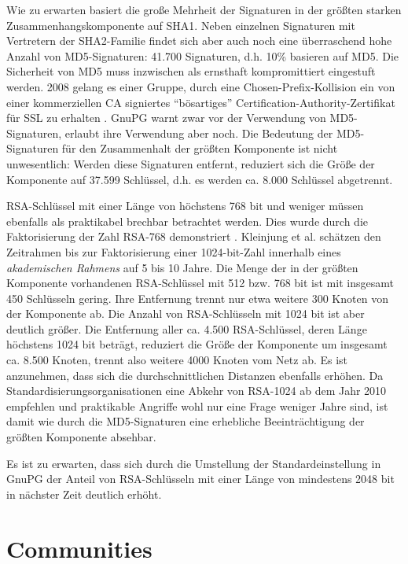 Wie zu erwarten basiert die große Mehrheit der Signaturen in der
größten starken Zusammenhangskomponente auf SHA1. Neben einzelnen
Signaturen mit Vertretern der SHA2-Familie findet sich aber auch noch
eine überraschend hohe Anzahl von MD5-Signaturen: 41.700 Signaturen,
d.h. 10\% basieren auf MD5. Die Sicherheit von MD5 muss inzwischen als
ernsthaft kompromittiert eingestuft werden. 2008 gelang es einer
Gruppe, durch eine Chosen-Prefix-Kollision ein von einer kommerziellen
CA signiertes ``bösartiges'' Certification-Authority-Zertifikat
für SSL zu erhalten \cite{Stevens2009}. GnuPG warnt zwar vor der
Verwendung von MD5-Signaturen, erlaubt ihre Verwendung aber noch. Die
Bedeutung der MD5-Signaturen für den Zusammenhalt der größten
Komponente ist nicht unwesentlich: Werden diese Signaturen entfernt,
reduziert sich die Größe der Komponente auf 37.599 Schlüssel,
d.h. es werden ca. 8.000 Schlüssel abgetrennt. 

RSA-Schlüssel mit einer Länge von höchstens 768 bit und weniger
müssen ebenfalls als praktikabel brechbar betrachtet werden. Dies
wurde durch die Faktorisierung der Zahl RSA-768 demonstriert
\cite{Kleinjung2010}. Kleinjung et al. schätzen den Zeitrahmen bis
zur Faktorisierung einer 1024-bit-Zahl innerhalb eines
\emph{akademischen Rahmens} auf 5 bis 10 Jahre. Die Menge der in der
größten Komponente vorhandenen RSA-Schlüssel mit 512 bzw. 768 bit
ist mit insgesamt 450 Schlüsseln gering. Ihre Entfernung trennt nur
etwa weitere 300 Knoten von der Komponente ab. Die Anzahl von
RSA-Schlüsseln mit 1024 bit ist aber deutlich größer. Die
Entfernung aller ca. 4.500 RSA-Schlüssel, deren Länge höchstens
1024 bit beträgt, reduziert die Größe der Komponente um insgesamt
ca. 8.500 Knoten, trennt also weitere 4000 Knoten vom Netz ab. Es ist
anzunehmen, dass sich die durchschnittlichen Distanzen ebenfalls
erhöhen. Da Standardisierungsorganisationen eine Abkehr von RSA-1024
ab dem Jahr 2010 empfehlen\cite{NIST2007} und praktikable Angriffe
wohl nur eine Frage weniger Jahre sind, ist damit wie durch die
MD5-Signaturen eine erhebliche Beeinträchtigung der größten
Komponente absehbar.

Es ist zu erwarten, dass sich durch die Umstellung der
Standardeinstellung in GnuPG der Anteil von RSA-Schlüsseln mit
einer Länge von mindestens 2048 bit in nächster Zeit deutlich
erhöht.

\section{Communities}
\label{sec:result-zusamm-und-comm}


